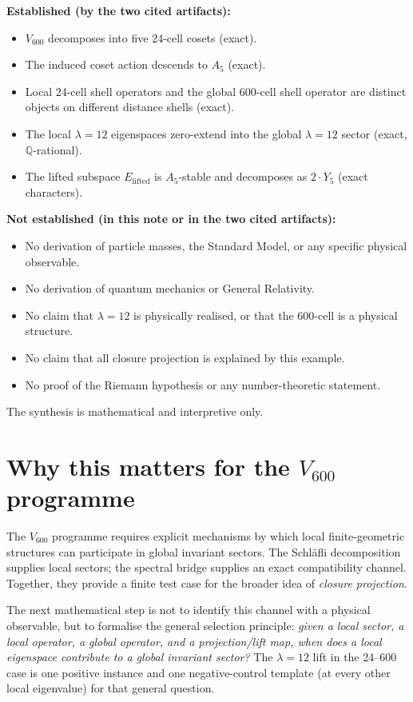 \documentclass[11pt]{article}
\newcommand{\Vsix}{V_{600}}
\newcommand{\Elift}{E_{\mathrm{lifted}}}
\theoremstyle{definition}
\begin{document}
\noindent\textbf{Established (by the two cited artifacts):}
\begin{itemize}
  \item $\Vsix$ decomposes into five 24-cell cosets (exact).
  \item The induced coset action descends to $A_5$ (exact).
  \item Local 24-cell shell operators and the global 600-cell
        shell operator are distinct objects on different distance
        shells (exact).
  \item The local $\lambda=12$ eigenspaces zero-extend into the
        global $\lambda=12$ sector (exact, $\mathbb{Q}$-rational).
  \item The lifted subspace $\Elift$ is $A_5$-stable and
        decomposes as $2\!\cdot\!Y_5$ (exact characters).
\end{itemize}

\noindent\textbf{Not established (in this note or in the two cited
artifacts):}
\begin{itemize}
  \item No derivation of particle masses, the Standard Model, or
        any specific physical observable.
  \item No derivation of quantum mechanics or General Relativity.
  \item No claim that $\lambda=12$ is physically realised, or that
        the 600-cell is a physical structure.
  \item No claim that all closure projection is explained by this
        example.
  \item No proof of the Riemann hypothesis or any number-theoretic
        statement.
\end{itemize}

The synthesis is mathematical and interpretive only.

\section{Why this matters for the $\Vsix$ programme}\label{sec:programme}

The $\Vsix$ programme requires explicit mechanisms by which local
finite-geometric structures can participate in global invariant
sectors.  The Schl\"afli decomposition supplies local sectors; the
spectral bridge supplies an exact compatibility channel.  Together,
they provide a finite test case for the broader idea of
\emph{closure projection}.

The next mathematical step is not to identify this channel with a
physical observable, but to formalise the general selection
principle: \emph{given a local sector, a local operator, a global
operator, and a projection/lift map, when does a local eigenspace
contribute to a global invariant sector?}  The $\lambda=12$ lift in
the 24--600 case is one positive instance and one negative-control
template (at every other local eigenvalue) for that general
question.
\end{document}

